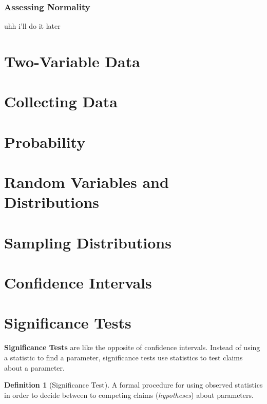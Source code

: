 \documentclass[12pt, a4paper]{article}
\theoremstyle{definition}
\newtheorem{definition}{Definition}
\begin{document}
\subsubsection{Assessing Normality}
uhh i'll do it later

\newpage

\section{Two-Variable Data}

\newpage

\section{Collecting Data}

\newpage

\section{Probability}

\newpage

\section{Random Variables and Distributions}

\newpage

\section{Sampling Distributions}

\newpage

\section{Confidence Intervals}

\newpage

\section{Significance Tests}
\textbf{Significance Tests} are like the opposite of confidence intervals. Instead of using a statistic to find a parameter, significance tests use statistics to test claims about a parameter.

\begin{definition}[Significance Test]
    A formal procedure for using observed statistics in order to decide between to competing claims (\textit{hypotheses}) about parameters.
\end{definition}
\end{document}
